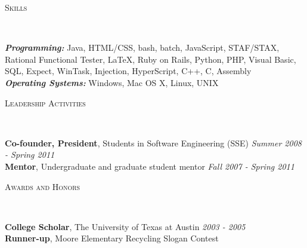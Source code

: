 \documentclass[9pt]{article}
\newenvironment{changemargin}[2]{%
  \begin{list}{}{%
    \setlength{\topsep}{0pt}%
    \setlength{\leftmargin}{#1}%
    \setlength{\rightmargin}{#2}%
    \setlength{\listparindent}{\parindent}%
    \setlength{\itemindent}{\parindent}%
    \setlength{\parsep}{\parskip}%
  }%
  \item[]}{\end{list}
}
\newcommand{\lineover}{
	\begin{changemargin}{-0.05in}{-0.05in}
		\vspace*{-8pt}
		\hrulefill \\
		\vspace*{-2pt}
	\end{changemargin}
}
\newcommand{\header}[1]{
	\begin{changemargin}{-0.5in}{-0.5in}
		\scshape{#1}\\
  	\lineover
	\end{changemargin}
}
\newenvironment{body} {
	\vspace*{-16pt}
	\begin{changemargin}{-0.25in}{-0.5in}
  }	
	{\end{changemargin}
}
\begin{document}
\header{Skills}

\begin{body}
	\vspace{14pt}
	\emph{\textbf{Programming:}}{} Java, HTML/CSS, bash, batch, JavaScript, STAF/STAX, Rational Functional Tester, \LaTeX, Ruby on Rails, Python, PHP, Visual Basic, SQL, Expect, WinTask, Injection, HyperScript, C++, C, Assembly\\
	\medskip
	\emph{\textbf{Operating Systems:}}{} Windows, Mac OS X, Linux, UNIX\\
\end{body}

\smallskip


\header{Leadership Activities}

\begin{body}
	\vspace{14pt}
	\textbf{Co-founder, President}, Students in Software Engineering (SSE) \hfill {} \emph{Summer 2008 - Spring 2011}\\
	\smallskip
	\textbf{Mentor}, Undergraduate and graduate student mentor \hfill{} \emph{Fall 2007 - Spring 2011}\\
\end{body}

\smallskip


\header{Awards and Honors}

\begin{body}
	\vspace{14pt}
	\textbf{College Scholar}, The University of Texas at Austin \hfill{} \emph{2003 - 2005}\\
	\smallskip
	\textbf{Runner-up}, Moore Elementary Recycling Slogan Contest
\end{body}
\end{document}
